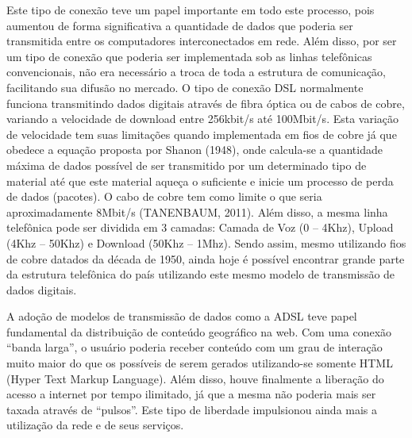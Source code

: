 Este tipo de conexão teve um papel importante em todo este processo, pois aumentou de forma significativa a quantidade de dados que poderia ser transmitida entre os computadores interconectados em rede. Além disso, por ser um tipo de conexão que poderia ser implementada sob as linhas telefônicas convencionais, não era necessário a troca de toda a estrutura de comunicação, facilitando sua difusão no mercado. O tipo de conexão DSL normalmente funciona transmitindo dados digitais através de fibra óptica ou de cabos de cobre, variando a velocidade de download entre 256kbit/s até 100Mbit/s. Esta variação de velocidade tem suas limitações quando implementada em fios de cobre já que obedece a equação proposta por Shanon (1948), onde calcula-se a quantidade máxima de dados possível de ser transmitido por um determinado tipo de material até que este material aqueça o suficiente e inicie um processo de perda de dados (pacotes). O cabo de cobre tem como limite o que seria aproximadamente 8Mbit/s (TANENBAUM, 2011). Além disso, a mesma linha telefônica pode ser dividida em 3 camadas: Camada de Voz (0 – 4Khz), Upload (4Khz – 50Khz) e Download (50Khz – 1Mhz). Sendo assim, mesmo utilizando fios de cobre datados da década de 1950, ainda hoje é possível encontrar grande parte da estrutura telefônica do país utilizando este mesmo modelo de transmissão de dados digitais. 

A adoção de modelos de transmissão de dados como a ADSL teve papel fundamental da distribuição de conteúdo geográfico na web. Com uma conexão “banda larga”, o usuário poderia receber conteúdo com um grau de interação muito maior do que os possíveis de serem gerados utilizando-se somente HTML (Hyper Text Markup Language). Além disso, houve finalmente a liberação do acesso a internet por tempo ilimitado, já que a mesma não poderia mais ser taxada através de “pulsos”. Este tipo de liberdade impulsionou ainda mais a utilização da rede e de seus serviços. 

